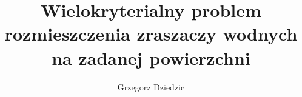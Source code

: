 \documentclass[twoside]{iisthesis}
\newcommand{\myfigure}[1]{%
\addcontentsline{figu}{myfigure}{\protect\numberline{\thefigure}#1}\par}
\begin{document}
\newcommand{\resultChart}[7][140]{
\def\dataS{{#2}}
	\begin{figure}[H]
	
\centering

\begin{center}
\begin{tikzpicture}
 
\begin{axis}[
ybar,
bar width=20,
legend style={at={(0.5,-0.25)},
anchor=north,legend columns=-1},
ylabel={Wartość miary},
symbolic x coords={\dataS},
xtick=data,
height=  {#1},
width=0.8\textwidth,
ymin=0, ytick={0,0.5,1},
ymax=1.5,
nodes near coords,
nodes near coords align={vertical},
]
\addplot coordinates { (\dataS,{#3}) };
\addplot coordinates {(\dataS,{#4}) };
\addplot coordinates { (\dataS,{#5}) };
\legend{Recall,Precission,F1-Score}
\end{axis}
\end{tikzpicture}
\end{center}
\caption{{#6}}
\myfigure{{#6}}
\label{{#7}}
\end{figure}
}


%
\nocite{*}
\title{ Wielokryterialny problem rozmieszczenia zraszaczy wodnych na zadanej powierzchni }
\shortTitle{}
\author{Grzegorz Dziedzic}

\date{\number\the\year}


\end{document}

